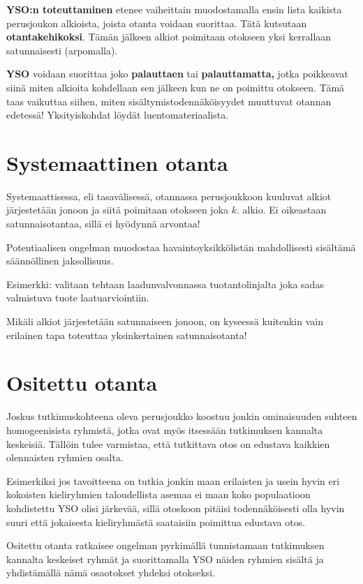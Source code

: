 \documentclass[
]{report}
\begin{document}
\textbf{YSO:n toteuttaminen} etenee vaiheittain muodostamalla ensin
lista kaikista perusjoukon alkioista, joista otanta voidaan suorittaa.
Tätä kutsutaan \textbf{otantakehikoksi}. Tämän jälkeen alkiot poimitaan
otokseen yksi kerrallaan satunnaisesti (arpomalla).

\textbf{YSO} voidaan suorittaa joko \textbf{palauttaen} tai
\textbf{palauttamatta,} jotka poikkeavat siinä miten alkioita kohdellaan
sen jälkeen kun ne on poimittu otokseen. Tämä taas vaikuttaa siihen,
miten sisältymistodennäköisyydet muuttuvat otannan edetessä!
Yksityiskohdat löydät luentomateriaalista.

\hypertarget{systemaattinen-otanta}{%
\section{Systemaattinen otanta}\label{systemaattinen-otanta}}

Systemaattisessa, eli tasavälisessä, otannassa perusjoukkoon kuuluvat
alkiot järjestetään jonoon ja siitä poimitaan otokseen joka \(k\).
alkio. Ei oikeastaan satunnaisotantaa, sillä ei hyödynnä arvontaa!

Potentiaalisen ongelman muodostaa havaintoyksikkölistän mahdollisesti
sisältämä säännöllinen jaksollisuus.

Esimerkki: valitaan tehtaan laadunvalvonnassa tuotantolinjalta joka
sadas valmistuva tuote laatuarviointiin.

Mikäli alkiot järjestetään satunnaiseen jonoon, on kyseessä kuitenkin
vain erilainen tapa toteuttaa yksinkertainen satunnaisotanta!

\hypertarget{ositettu-otanta}{%
\section{Ositettu otanta}\label{ositettu-otanta}}

Joskus tutkimuskohteena oleva perusjoukko koostuu jonkin ominaisuuden
suhteen homogeenisista ryhmistä, jotka ovat myös itsessään tutkimuksen
kannalta keskeisiä. Tällöin tulee varmistaa, että tutkittava otos on
edustava kaikkien olennaisten ryhmien osalta.

Esimerkiksi jos tavoitteena on tutkia jonkin maan erilaisten ja usein
hyvin eri kokoisten kieliryhmien taloudellista asemaa ei maan koko
populaatioon kohdistettu YSO olisi järkevää, sillä otoskoon pitäisi
todennäköisesti olla hyvin suuri että jokaisesta kieliryhmästä
saataisiin poimittua edustava otos.

Ositettu otanta ratkaisee ongelman pyrkimällä tunnistamaan tutkimuksen
kannalta keskeiset ryhmät ja suorittamalla YSO näiden ryhmien sisältä ja
yhdistämällä nämä osaotokset yhdeksi otokseksi.
\end{document}
